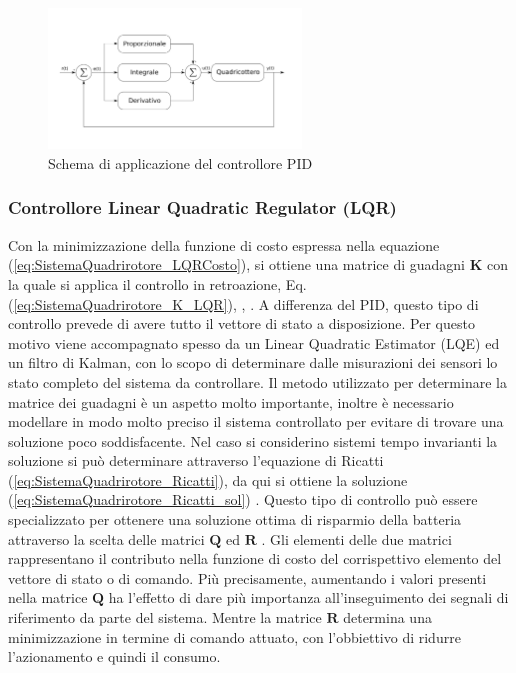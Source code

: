\begin{figure}
	\centering
	\includegraphics[width=0.6\textwidth]{SistemaQuadrirotore/Figure/PID}
	\caption{Schema di applicazione del controllore PID}
\end{figure}

\subsubsection{Controllore Linear Quadratic Regulator (LQR)}
Con la minimizzazione della funzione di costo espressa nella equazione (\ref{eq:SistemaQuadrirotore_LQRCosto}), si ottiene una matrice di guadagni $\mathbf{K}$ con la quale si applica il controllo in retroazione, Eq. (\ref{eq:SistemaQuadrirotore_K_LQR}), \cite{ParaskevopoulosP.N2002MCE}, \cite{6572698}. A differenza del PID, questo tipo di controllo prevede di avere tutto il vettore di stato a disposizione. Per questo motivo viene accompagnato spesso da un Linear Quadratic Estimator (LQE) ed un filtro di Kalman, con lo scopo di determinare dalle misurazioni dei sensori lo stato completo del sistema da controllare. Il metodo utilizzato per determinare la matrice dei guadagni è un aspetto molto importante, inoltre è necessario modellare in modo molto preciso il sistema controllato per evitare di trovare una soluzione poco soddisfacente. Nel caso si considerino sistemi tempo invarianti la soluzione si può determinare attraverso l'equazione di Ricatti (\ref{eq:SistemaQuadrirotore_Ricatti}), da qui si ottiene la soluzione (\ref{eq:SistemaQuadrirotore_Ricatti_sol}) \cite{baseTesi}. Questo tipo di controllo può essere specializzato per ottenere una soluzione ottima di risparmio della batteria attraverso la scelta delle matrici $\mathbf{Q}$ ed $\mathbf{R}$ \cite{KoksalN2018ALQA}. Gli elementi delle due matrici rappresentano il contributo nella funzione di costo del corrispettivo elemento del vettore di stato o di comando. Più precisamente, aumentando i valori presenti nella matrice $\mathbf{Q}$ ha l'effetto di dare più importanza all'inseguimento dei segnali di riferimento da parte del sistema. Mentre la matrice $\mathbf{R}$ determina una minimizzazione in termine di comando attuato, con l'obbiettivo di ridurre l'azionamento e quindi il consumo.

